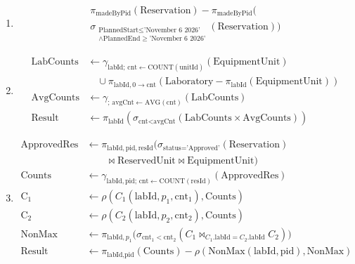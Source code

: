 \documentclass[11pt,a4paper]{article}
\begin{document}
\begin{enumerate}
    \item[\textbf{12.}] 
    \[
    \begin{multlined}
    \pi_{\text{madeByPid}}(\text{Reservation}) - \pi_{\text{madeByPid}}\Big( \\
    \sigma_{\substack{\text{PlannedStart} \le \text{'November 6 2026'} \\ \land \text{PlannedEnd} \ge \text{'November 6 2026'}}} (\text{Reservation}) \Big)
    \end{multlined}
    \]

    \item[\textbf{13.}] 
    \[
    \begin{aligned}
    \text{LabCounts} &\leftarrow \gamma_{\text{labId};\, \text{cnt} \leftarrow \text{COUNT}(\text{unitId})}(\text{EquipmentUnit}) \\
    &\quad {}\cup \pi_{\text{labId}, 0 \to \text{cnt}}(\text{Laboratory} - \pi_{\text{labId}}(\text{EquipmentUnit})) \\
    \text{AvgCounts} &\leftarrow \gamma_{;\, \text{avgCnt} \leftarrow \text{AVG}(\text{cnt})}(\text{LabCounts}) \\
    \text{Result} &\leftarrow \pi_{\text{labId}}\left(\sigma_{\text{cnt} < \text{avgCnt}}(\text{LabCounts} \times \text{AvgCounts})\right)
    \end{aligned}
    \]

    \item[\textbf{14.}] 
    \[
    \begin{aligned}
    \text{ApprovedRes} &\leftarrow \pi_{\text{labId}, \text{pid}, \text{resId}}\big(\sigma_{\text{status}=\text{'Approved'}}(\text{Reservation}) \\
    &\qquad \bowtie \text{ReservedUnit} \bowtie \text{EquipmentUnit}\big) \\
    \text{Counts} &\leftarrow \gamma_{\text{labId}, \text{pid};\, \text{cnt} \leftarrow \text{COUNT}(\text{resId})}(\text{ApprovedRes}) \\
    \text{C}_1 &\leftarrow \rho(C_1(\text{labId}, p_1, \text{cnt}_1), \text{Counts}) \\
    \text{C}_2 &\leftarrow \rho(C_2(\text{labId}, p_2, \text{cnt}_2), \text{Counts}) \\
    \text{NonMax} &\leftarrow \pi_{\text{labId}, p_1}\big(\sigma_{\text{cnt}_1 < \text{cnt}_2}(C_1 \bowtie_{C_1.\text{labId} = C_2.\text{labId}} C_2)\big) \\
    \text{Result} &\leftarrow \pi_{\text{labId}, \text{pid}}(\text{Counts}) - \rho(\text{NonMax}(\text{labId}, \text{pid}), \text{NonMax})
    \end{aligned}
    \]


\end{enumerate}
\end{document}
